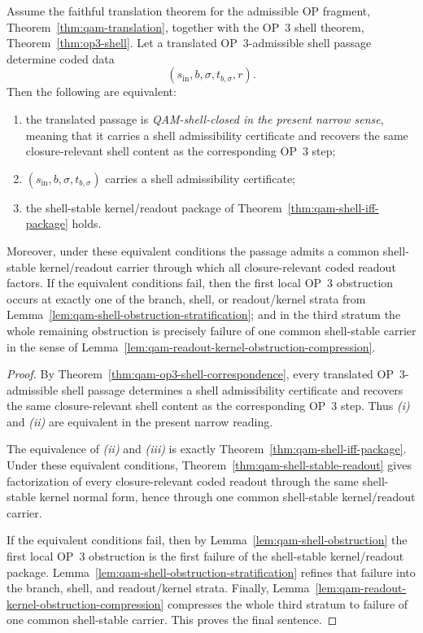 \begin{theorem}\label{thm:qam-op3-shell-closure}
Assume the faithful translation theorem for the admissible OP fragment, Theorem~\ref{thm:qam-translation}, together with the OP~3 shell theorem, Theorem~\ref{thm:op3-shell}. Let a translated OP~3-admissible shell passage determine coded data
\[
(s_{\mathrm{in}},b,\sigma,t_{b,\sigma},r).
\]
Then the following are equivalent:
\begin{enumerate}[leftmargin=2em,label=(\roman*)]
  \item the translated passage is \emph{QAM-shell-closed in the present narrow sense}, meaning that it carries a shell admissibility certificate and recovers the same closure-relevant shell content as the corresponding OP~3 step;
  \item $(s_{\mathrm{in}},b,\sigma,t_{b,\sigma})$ carries a shell admissibility certificate;
  \item the shell-stable kernel/readout package of Theorem~\ref{thm:qam-shell-iff-package} holds.
\end{enumerate}
Moreover, under these equivalent conditions the passage admits a common shell-stable kernel/readout carrier through which all closure-relevant coded readout factors. If the equivalent conditions fail, then the first local OP~3 obstruction occurs at exactly one of the branch, shell, or readout/kernel strata from Lemma~\ref{lem:qam-shell-obstruction-stratification}; and in the third stratum the whole remaining obstruction is precisely failure of one common shell-stable carrier in the sense of Lemma~\ref{lem:qam-readout-kernel-obstruction-compression}.
\end{theorem}

\begin{proof}
By Theorem~\ref{thm:qam-op3-shell-correspondence}, every translated OP~3-admissible shell passage determines a shell admissibility certificate and recovers the same closure-relevant shell content as the corresponding OP~3 step. Thus \emph{(i)} and \emph{(ii)} are equivalent in the present narrow reading.

The equivalence of \emph{(ii)} and \emph{(iii)} is exactly Theorem~\ref{thm:qam-shell-iff-package}. Under these equivalent conditions, Theorem~\ref{thm:qam-shell-stable-readout} gives factorization of every closure-relevant coded readout through the same shell-stable kernel normal form, hence through one common shell-stable kernel/readout carrier.

If the equivalent conditions fail, then by Lemma~\ref{lem:qam-shell-obstruction} the first local OP~3 obstruction is the first failure of the shell-stable kernel/readout package. Lemma~\ref{lem:qam-shell-obstruction-stratification} refines that failure into the branch, shell, and readout/kernel strata. Finally, Lemma~\ref{lem:qam-readout-kernel-obstruction-compression} compresses the whole third stratum to failure of one common shell-stable carrier. This proves the final sentence.
\end{proof}

